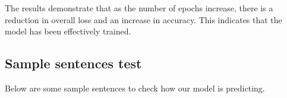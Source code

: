The results demonstrate that as the number of epochs increase, there is a reduction in overall loss and an increase in accuracy. This indicates that the model has been effectively trained.   

\newpage

\subsection{Sample sentences test}

Below are some sample sentences to check how our model is predicting.

\begin{figure}[h]
	\centering

\end{figure}
